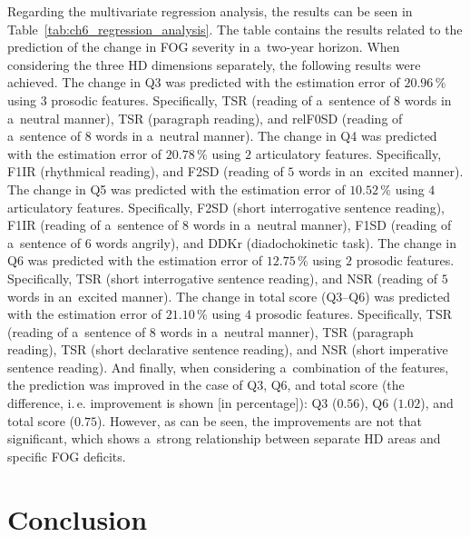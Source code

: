 \newpage
Regarding the multivariate regression analysis, the results can be seen in Table~\ref{tab:ch6_regression_analysis}. The table contains the results related to the prediction of the change in FOG severity in a~two-year horizon. When considering the three HD dimensions separately, the following results were achieved. The change in Q3 was predicted with the estimation error of $20.96\,\%$ using $3$ prosodic features. Specifically, TSR (reading of a~sentence of $8$ words in a~neutral manner), TSR (paragraph reading), and relF0SD (reading of a~sentence of $8$ words in a~neutral manner). The change in Q4 was predicted with the estimation error of $20.78\,\%$ using $2$ articulatory features. Specifically, F1IR (rhythmical reading), and F2SD (reading of $5$ words in an~excited manner). The change in Q5 was predicted with the estimation error of $10.52\,\%$ using $4$ articulatory features. Specifically, F2SD (short interrogative sentence reading), F1IR (reading of a~sentence of $8$ words in a~neutral manner), F1SD (reading of a~sentence of $6$ words angrily), and DDKr (diadochokinetic task). The change in Q6 was predicted with the estimation error of $12.75\,\%$ using $2$ prosodic features. Specifically, TSR (short interrogative sentence reading), and NSR (reading of $5$ words in an~excited manner). The change in total score (Q3--Q6) was predicted with the estimation error of $21.10\,\%$ using $4$ prosodic features. Specifically, TSR (reading of a~sentence of $8$ words in a~neutral manner), TSR (paragraph reading), TSR (short declarative sentence reading), and NSR (short imperative sentence reading). And finally, when considering a~combination of the features, the prediction was improved in the case of Q3, Q6, and total score (the difference, i.\,e. improvement is shown [in percentage]): Q3 ($0.56$), Q6 ($1.02$), and total score ($0.75$). However, as can be seen, the improvements are not that significant, which shows a~strong relationship between separate HD areas and specific FOG deficits.

\section{Conclusion}
\label{ch6_5}

